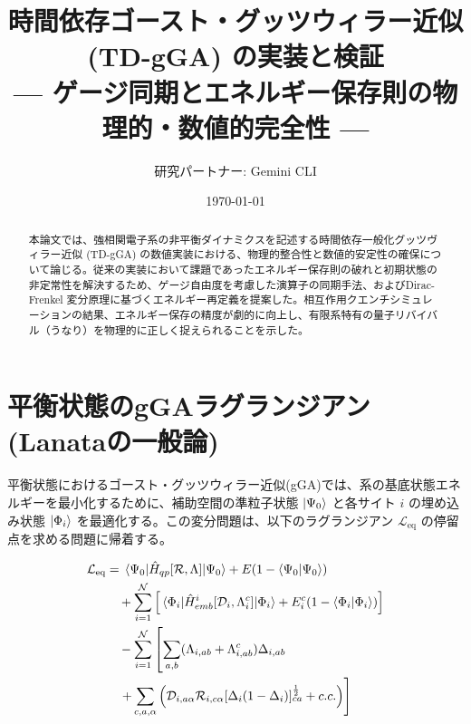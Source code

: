 \documentclass[a4paper,11pt]{ltjarticle}
\title{時間依存ゴースト・グッツウィラー近似 (TD-gGA) の実装と検証\\ --- ゲージ同期とエネルギー保存則の物理的・数値的完全性 ---}
\author{研究パートナー: Gemini CLI}
\date{\today}
\begin{document}
\maketitle

\begin{abstract}
本論文では、強相関電子系の非平衡ダイナミクスを記述する時間依存一般化グッツヴィラー近似 (TD-gGA) の数値実装における、物理的整合性と数値的安定性の確保について論じる。従来の実装において課題であったエネルギー保存則の破れと初期状態の非定常性を解決するため、ゲージ自由度を考慮した演算子の同期手法、およびDirac-Frenkel 変分原理に基づくエネルギー再定義を提案した。相互作用クエンチシミュレーションの結果、エネルギー保存の精度が劇的に向上し、有限系特有の量子リバイバル（うなり）を物理的に正しく捉えられることを示した。
\end{abstract}

\section{平衡状態のgGAラグランジアン (Lanataの一般論)}
平衡状態におけるゴースト・グッツウィラー近似(gGA)では、系の基底状態エネルギーを最小化するために、補助空間の準粒子状態 $\ket{\Psi_0}$ と各サイト $i$ の埋め込み状態 $\ket{\Phi_i}$ を最適化する。この変分問題は、以下のラグランジアン $\mathcal{L}_{\text{eq}}$ の停留点を求める問題に帰着する。

\begin{align}
\mathcal{L}_{\text{eq}} &= \mel{\Psi_0}{\hat{H}_{qp}[\mathcal{R}, \Lambda]}{\Psi_0} + E(1 - \braket{\Psi_0}{\Psi_0}) \notag \\
&\quad + \sum_{i=1}^{\mathcal{N}} \left[ \mel{\Phi_i}{\hat{H}_{emb}^i[\mathcal{D}_i, \Lambda_i^c]}{\Phi_i} + E_i^c(1 - \braket{\Phi_i}{\Phi_i}) \right] \notag \\
&\quad - \sum_{i=1}^{\mathcal{N}} \left[ \sum_{a,b} (\Lambda_{i,ab} + \Lambda_{i,ab}^c)\Delta_{i,ab} \right. \notag \\
&\quad \left. + \sum_{c,a,\alpha} \left( \mathcal{D}_{i,a\alpha} \mathcal{R}_{i,c\alpha} [\Delta_i(1-\Delta_i)]_{ca}^{\frac{1}{2}} + c.c. \right) \right]
\label{eq:L_eq}
\end{align}
\end{document}

